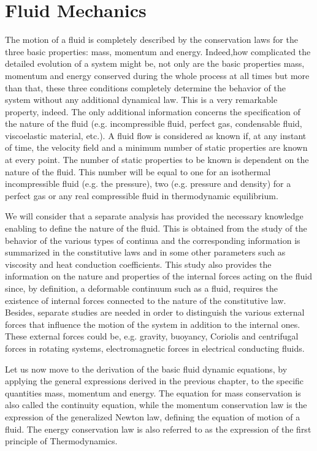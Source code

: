 \chapter{Fluid Mechanics}

The motion of a fluid is completely described by the conservation laws for the three basic properties: mass, momentum and energy.
Indeed,how complicated the detailed evolution of a system might be, not only are the basic
properties mass, momentum and energy conserved during the whole process at all
times but more than that, these three conditions
completely determine the behavior of the system without any additional dynamical
law.
This is a very remarkable property, indeed. The only additional information
concerns the specification of the nature of the fluid (e.g. incompressible fluid, perfect
gas, condensable fluid, viscoelastic material, etc.).
A fluid flow is considered as known if, at any instant of time, the velocity field
and a minimum number of static properties are known at every point. The number of
static properties to be known is dependent on the nature of the fluid. This number will
be equal to one for an isothermal incompressible fluid (e.g. the pressure), two (e.g.
pressure and density) for a perfect gas or any real compressible fluid in thermodynamic
equilibrium.

We will consider that a separate analysis has provided the necessary knowledge
enabling to define the nature of the fluid. This is obtained from the study of the behavior
of the various types of continua and the corresponding information is summarized
in the constitutive laws and in some other parameters such as viscosity and heat
conduction coefficients. This study also provides the information on the nature and
properties of the internal forces acting on the fluid since, by definition, a deformable
continuum such as a fluid, requires the existence of internal forces connected to the
nature of the constitutive law.
Besides, separate studies are needed in order to distinguish the various external
forces that influence the motion of the system in addition to the internal ones. These
external forces could be, e.g. gravity, buoyancy, Coriolis and centrifugal forces in
rotating systems, electromagnetic forces in electrical conducting fluids.

Let us now move to the derivation of the basic fluid dynamic equations, by
applying the general expressions derived in the previous chapter, to the specific quantities
mass, momentum and energy.
The equation for mass conservation is also called the continuity equation, while the
momentum conservation law is the expression of the generalized Newton law, defining
the equation of motion of a fluid. The energy conservation law is also referred to as
the expression of the first principle of Thermodynamics.


